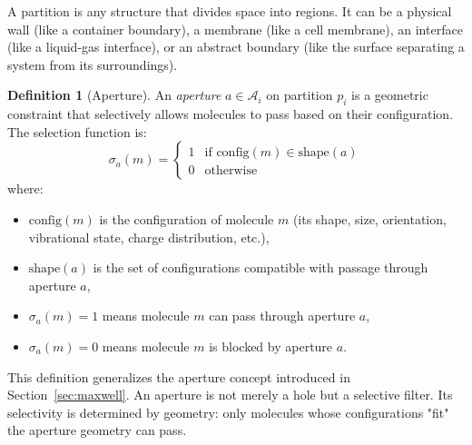 \documentclass[12pt,a4paper]{article}
\theoremstyle{definition}
\newtheorem{definition}[theorem]{Definition}
\theoremstyle{remark}
\begin{document}
A partition is any structure that divides space into regions. It can be a physical wall (like a container boundary), a membrane (like a cell membrane), an interface (like a liquid-gas interface), or an abstract boundary (like the surface separating a system from its surroundings).

\begin{definition}[Aperture]
\label{def:aperture_enthalpy}
An \emph{aperture} $a \in \mathcal{A}_i$ on partition $p_i$ is a geometric constraint that selectively allows molecules to pass based on their configuration. The selection function is:
\begin{equation}
\sigma_a(m) = \begin{cases} 
1 & \text{if } \text{config}(m) \in \text{shape}(a) \\ 
0 & \text{otherwise} 
\end{cases}
\end{equation}
where:
\begin{itemize}
    \item $\text{config}(m)$ is the configuration of molecule $m$ (its shape, size, orientation, vibrational state, charge distribution, etc.),
    \item $\text{shape}(a)$ is the set of configurations compatible with passage through aperture $a$,
    \item $\sigma_a(m) = 1$ means molecule $m$ can pass through aperture $a$,
    \item $\sigma_a(m) = 0$ means molecule $m$ is blocked by aperture $a$.
\end{itemize}
\end{definition}

This definition generalizes the aperture concept introduced in Section~\ref{sec:maxwell}. An aperture is not merely a hole but a selective filter. Its selectivity is determined by geometry: only molecules whose configurations "fit" the aperture geometry can pass.
\end{document}
